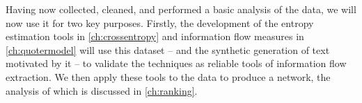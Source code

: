 Having now collected, cleaned, and performed a basic analysis of the data, we will now use it for two key purposes. Firstly, the development of the entropy estimation tools in \autoref{ch:crossentropy} and information flow measures in \autoref{ch:quotermodel} will use this dataset -- and the synthetic generation of text motivated by it -- to validate the techniques as reliable tools of information flow extraction. We then apply these tools to the data to produce a network, the analysis of which is discussed in \autoref{ch:ranking}.


%
